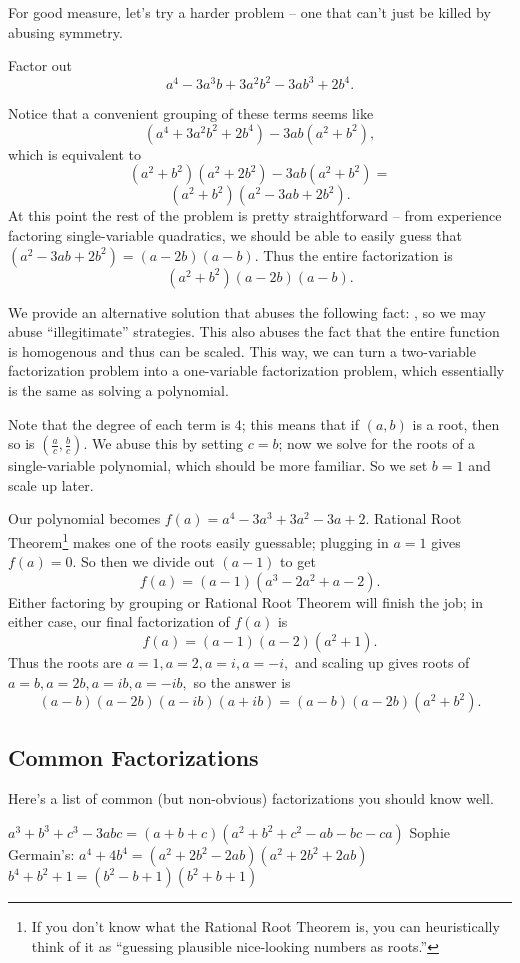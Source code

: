 \documentclass[mast]{lucky}
\begin{document}
For good measure, let's try a harder problem -- one that can't just be killed by abusing symmetry.

\begin{exam}
Factor out
\[a^4-3a^3b+3a^2b^2-3ab^3+2b^4.\]
\end{exam}

\begin{sol}[1]
Notice that a convenient grouping of these terms seems like
\[(a^4+3a^2b^2+2b^4)-3ab(a^2+b^2),\]
which is equivalent to
\[(a^2+b^2)(a^2+2b^2)-3ab(a^2+b^2)=\]
\[(a^2+b^2)(a^2-3ab+2b^2).\]
At this point the rest of the problem is pretty straightforward -- from experience factoring single-variable quadratics, we should be able to easily guess that $(a^2-3ab+2b^2)=(a-2b)(a-b).$ Thus the entire factorization is
\[(a^2+b^2)(a-2b)(a-b).\]
\end{sol}

We provide an alternative solution that abuses the following fact: , so we may abuse ``illegitimate'' strategies. This also abuses the fact that the entire function is homogenous and thus can be scaled. This way, we can turn a two-variable factorization problem into a one-variable factorization problem, which essentially is the same as solving a polynomial.

\begin{sol}[2]
Note that the degree of each term is $4$; this means that if $(a,b)$ is a root, then so is $(\frac{a}{c},\frac{b}{c}).$ We abuse this by setting $c=b$; now we solve for the roots of a single-variable polynomial, which should be more familiar. So we set $b=1$ and scale up later.

Our polynomial becomes $f(a)=a^4-3a^3+3a^2-3a+2.$ Rational Root Theorem\footnote{If you don't know what the Rational Root Theorem is, you can heuristically think of it as ``guessing plausible nice-looking numbers as roots.''} makes one of the roots easily guessable; plugging in $a=1$ gives $f(a)=0.$ So then we divide out $(a-1)$ to get
\[f(a)=(a-1)(a^3-2a^2+a-2).\]
Either factoring by grouping or Rational Root Theorem will finish the job; in either case, our final factorization of $f(a)$ is
\[f(a)=(a-1)(a-2)(a^2+1).\]
Thus the roots are $a=1,a=2,a=i,a=-i,$ and scaling up gives roots of $a=b,a=2b,a=ib,a=-ib,$ so the answer is
\[(a-b)(a-2b)(a-ib)(a+ib)=(a-b)(a-2b)(a^2+b^2).\]
\end{sol}

\subsection{Common Factorizations}
Here's a list of common (but non-obvious) factorizations you should know well.
\begin{fact}\hfill
\begin{itemize}
     \Item $a^3+b^3+c^3-3abc=(a+b+c)(a^2+b^2+c^2-ab-bc-ca)$
     \Item Sophie Germain's: $a^4+4b^4=(a^2+2b^2-2ab)(a^2+2b^2+2ab)$
     \Item $b^4+b^2+1=(b^2-b+1)(b^2+b+1)$
\end{itemize}
\end{fact}
\end{document}
